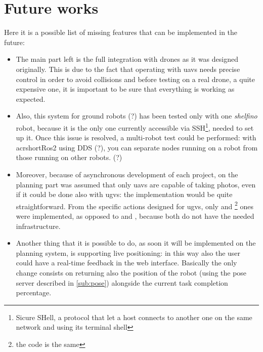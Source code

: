 \chapter{Future works}
\label{cha:futureworks}

Here it is a possible list of missing features that can be implemented in the future:

\begin{itemize}

\item The main part left is the full integration with drones as it was designed originally. This is due to the fact that operating with \acrshort{uav}s needs precise control in order to avoid collisions and before testing on a real drone, a quite expensive one, it is important to be sure that everything is working as expected.

\item Also, this system for ground robots (?) has been tested only with one \textit{shelfino} robot, because it is the only one currently accessible via SSH\footnote{Sicure SHell, a protocol that let a host connects to another one on the same network and using its terminal shell}, needed to set up it. Once this issue is resolved, a multi-robot test could be performed: with acrshort{Ros}2 using DDS (?), you can separate nodes running on a robot from those running on other robots. (?) %

\item Moreover, because of asynchronous development of each project, on the planning part was assumed that only \acrshort{uav}s are capable of taking photos, even if it could be done also with \acrshort{ugv}s: the implementation would be quite straightforward. From the specific actions designed for \acrshort{ugv}s, only  and \footnote{the code is the same} ones were implemented, as opposed to  and , because both do not have the needed infrastructure.

\item Another thing that it is possible to do, as soon it will be implemented on the planning system, is supporting live positioning: in this way also the user could have a real-time feedback in the web interface. Basically the only change consists on returning also the position of the robot (using the pose server described in \autoref{sub:pose}) alongside the current task completion percentage.


\end{itemize}
